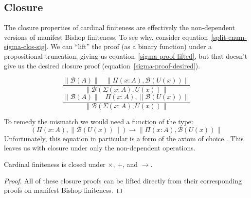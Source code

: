 \subsection{Closure}
The closure properties of cardinal finiteness are effectively the non-dependent
versions of manifest Bishop finiteness.
To see why, consider equation~\ref{split-enum-sigma-clos-sig}.
We can ``lift'' the proof (as a binary function) under a propositional
truncation, giving us equation~\ref{sigma-proof-lifted}, but that doesn't give us
the desired closure proof (equation~\ref{sigma-proof-desired}).
\begin{multicols}{2}
  \noindent
  \begin{equation} \label{sigma-proof-lifted}
    \frac{
      \lVert \mathcal{B}(A) \rVert \; \; \; \lVert \Pi (x : A) , \mathcal{B}(U(x)) \rVert
    }{
      \lVert \mathcal{B}(\Sigma(x : A) , U(x)) \rVert
    }
  \end{equation}
  \begin{equation} \label{sigma-proof-desired}
    \frac{
      \lVert \mathcal{B}(A) \rVert \; \; \; \Pi (x : A) , \lVert \mathcal{B}(U(x))  \rVert
    }{
      \lVert \mathcal{B}(\Sigma(x : A) , U(x)) \rVert
    }
  \end{equation}
\end{multicols}%
To remedy the mismatch we would need a function of the type:
\begin{equation}
  \left( \Pi(x : A) , \lVert \mathcal{B}(U(x)) \rVert \right) \rightarrow
  \lVert \Pi(x : A) , \mathcal{B}(U(x)) \rVert
\end{equation}
Unfortunately, this equation in particular is a form of the axiom of choice
\cite[equation 3.8.3]{hottbook}.
This leaves us with closure under only the non-dependent operations.
\begin{rm-lemma}
  Cardinal finiteness is closed under \(\times\), \(+\), and \(\rightarrow\).
\end{rm-lemma}
\begin{proof}
  All of these closure proofs can be lifted directly from their corresponding
  proofs on manifest Bishop finiteness.
\end{proof}
